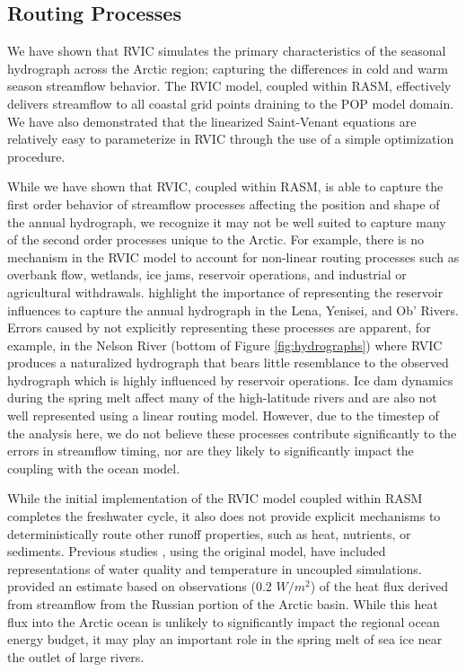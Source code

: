 \documentclass[jgrga, draft]{agutex}
\begin{document}
\begin{article}
\subsection{Routing Processes}

We have shown that RVIC simulates the primary characteristics of the seasonal hydrograph across the Arctic region; capturing the differences in cold and warm season streamflow behavior.
The RVIC model, coupled within RASM, effectively delivers streamflow to all coastal grid points draining to the POP model domain.
We have also demonstrated that the linearized Saint-Venant equations are relatively easy to parameterize in RVIC through the use of a simple optimization procedure.

While we have shown that RVIC, coupled within RASM, is able to capture the first order behavior of streamflow processes affecting the position and shape of the annual hydrograph, we recognize it may not be well suited to capture many of the second order processes unique to the Arctic.
For example, there is no mechanism in the RVIC model to account for non-linear routing processes such as overbank flow, wetlands, ice jams, reservoir operations, and industrial or agricultural withdrawals.
\citet{Adam_2007} highlight the importance of representing the reservoir influences to capture the annual hydrograph in the Lena, Yenisei, and Ob' Rivers.
Errors caused by not explicitly representing these processes are apparent, for example, in the Nelson River (bottom of Figure \ref{fig:hydrographs}) where RVIC produces a naturalized hydrograph that bears little resemblance to the observed hydrograph which is highly influenced by reservoir operations.
Ice dam dynamics during the spring melt affect many of the high-latitude rivers and are also not well represented using a linear routing model.
However, due to the timestep of the analysis here, we do not believe these processes contribute significantly to the errors in streamflow timing, nor are they likely to significantly impact the coupling with the ocean model.

While the initial implementation of the RVIC model coupled within RASM completes the freshwater cycle, it also does not provide explicit mechanisms to deterministically route other runoff properties, such as heat, nutrients, or sediments.
Previous studies \citep[e.g.][]{vanVliet_2011,vanVliet_2012}, using the original \citet{Lohmann_1996} model, have included representations of water quality and temperature in uncoupled simulations.
\citet{Lammers_2007} provided an estimate based on observations (0.2 $W/m^2$) of the heat flux derived from streamflow from the Russian portion of the Arctic basin.
While this heat flux into the Arctic ocean is unlikely to significantly impact the regional ocean energy budget, it may play an important role in the spring melt of sea ice near the outlet of large rivers.


\end{article}
\end{document}
